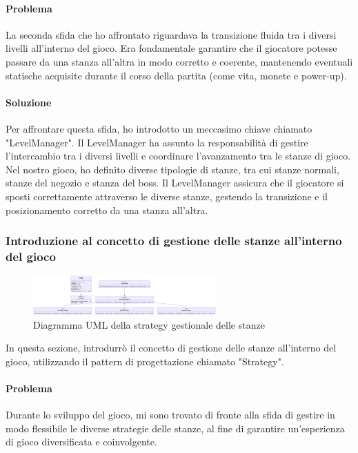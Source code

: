 \documentclass[a4paper,12pt]{report}
\begin{document}
\paragraph{Problema}
La seconda sfida che ho affrontato riguardava la transizione fluida tra i diversi livelli all'interno del gioco. 
Era fondamentale garantire che il giocatore potesse passare da una stanza all'altra in modo corretto e coerente, mantenendo eventuali statische acquisite durante il corso della partita (come vita, monete e power-up).
\paragraph{Soluzione}
Per affrontare questa sfida, ho introdotto un meccasimo chiave chiamato "LevelManager".
Il LevelManager ha assunto la responsabilità di gestire l'intercambio tra i diversi livelli e coordinare l'avanzamento tra le stanze di gioco. 
Nel nostro gioco, ho definito diverse tipologie di stanze, tra cui stanze normali, stanze del negozio e stanza del boss.
Il LevelManager assicura che il giocatore si sposti correttamente attraverso le diverse stanze, gestendo la transizione e il posizionamento corretto da una stanza all'altra.
\subsubsection*{Introduzione al concetto di gestione delle stanze all'interno del gioco}

\begin{figure}[h]
	\centering
	\includegraphics[width=7cm]{uml/RoomStrategy1}
	\caption{Diagramma UML della strategy gestionale delle stanze}
\end{figure}

In questa sezione, introdurrò il concetto di gestione delle stanze all'interno del gioco, utilizzando il pattern di progettazione chiamato "Strategy".
\paragraph*{Problema}
Durante lo sviluppo del gioco, mi sono trovato di fronte alla sfida di gestire in modo flessibile le diverse strategie delle stanze, al fine di garantire un'esperienza di gioco diversificata e coinvolgente.
\end{document}
